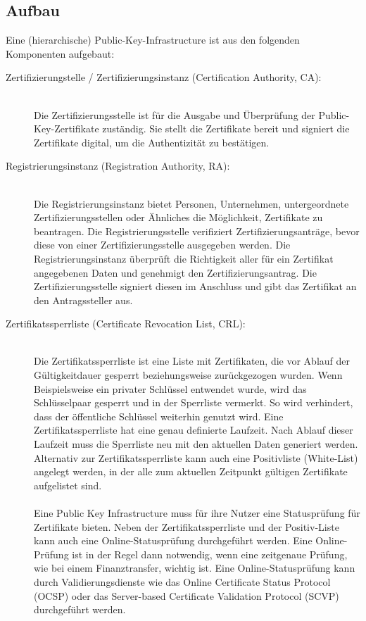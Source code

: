 \subsection{Aufbau}
Eine (hierarchische) Public-Key-Infrastructure ist aus den folgenden Komponenten aufgebaut:
\begin{description}
\item[Zertifizierungstelle / Zertifizierungsinstanz (Certification Authority, CA):]\hfil\\
Die Zertifizierungsstelle ist für die Ausgabe und Überprüfung der Public-Key-Zertifikate zuständig. Sie stellt die Zertifikate bereit und signiert die Zertifikate digital, um die Authentizität zu bestätigen.
\item[Registrierungsinstanz (Registration Authority, RA):]\hfill \\
Die Registrierungsinstanz bietet Personen, Unternehmen, untergeordnete Zertifizierungsstellen oder Ähnliches die Möglichkeit, Zertifikate zu beantragen. Die Registrierungsstelle verifiziert Zertifizierungsanträge, bevor diese von einer Zertifizierungsstelle ausgegeben werden. Die Registrierungsinstanz überprüft die Richtigkeit aller für ein Zertifikat angegebenen Daten und genehmigt den Zertifizierungsantrag. Die Zertifizierungsstelle signiert diesen im Anschluss und gibt das Zertifikat an den Antragssteller aus.
\item[Zertifikatssperrliste (Certificate Revocation List, CRL):]\hfill \\
Die Zertifikatssperrliste ist eine Liste mit Zertifikaten, die vor Ablauf der Gültigkeitdauer gesperrt beziehungsweise zurückgezogen wurden. Wenn Beispielsweise ein
privater Schlüssel entwendet wurde, wird das Schlüsselpaar gesperrt und in der Sperrliste vermerkt. So wird verhindert, dass der öffentliche Schlüssel weiterhin genutzt wird.
Eine Zertifikatssperrliste hat eine genau definierte Laufzeit. Nach Ablauf dieser Laufzeit muss die Sperrliste neu mit den aktuellen Daten generiert werden. Alternativ zur Zertifikatssperrliste kann auch eine Positivliste (White-List) angelegt werden, in der alle zum aktuellen Zeitpunkt gültigen Zertifikate aufgelistet sind.\\
\\
Eine Public Key Infrastructure muss für ihre Nutzer eine Statusprüfung für Zertifikate bieten. Neben der Zertifikatssperrliste und der Positiv-Liste kann auch eine Online-Statusprüfung durchgeführt werden. Eine Online-Prüfung ist in der Regel dann notwendig, wenn eine zeitgenaue Prüfung, wie bei einem Finanztransfer, wichtig ist. Eine Online-Statusprüfung kann durch Validierungsdienste wie das Online Certificate Status Protocol (OCSP) oder das Server-based Certificate Validation Protocol (SCVP) durchgeführt werden.

\end{description}
